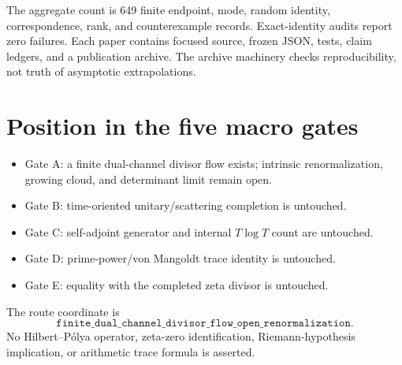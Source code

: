 \documentclass[12pt]{article}
\theoremstyle{remark}\newtheorem{remark}[theorem]{Remark}
\begin{document}
The aggregate count is 649 finite endpoint, mode, random identity,
correspondence, rank, and counterexample records.  Exact-identity audits
report zero failures.  Each paper contains focused source, frozen JSON,
tests, claim ledgers, and a publication archive.  The archive machinery
checks reproducibility, not truth of asymptotic extrapolations.

\section{Position in the five macro gates}

\begin{itemize}[leftmargin=2em]
\item Gate A: a finite dual-channel divisor flow exists; intrinsic
renormalization, growing cloud, and determinant limit remain open.
\item Gate B: time-oriented unitary/scattering completion is untouched.
\item Gate C: self-adjoint generator and internal $T\log T$ count are
untouched.
\item Gate D: prime-power/von Mangoldt trace identity is untouched.
\item Gate E: equality with the completed zeta divisor is untouched.
\end{itemize}

The route coordinate is
\begin{equation*}
 \boxed{\texttt{finite\_dual\_channel\_divisor\_flow\_open\_renormalization}}.
\end{equation*}
No Hilbert--P\'olya operator, zeta-zero identification, Riemann-hypothesis
implication, or arithmetic trace formula is asserted.


\end{document}
